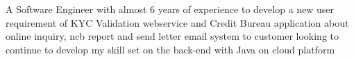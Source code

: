 


\begin{cvparagraph}


\quad A Software Engineer with almost 6 years of experience to develop a new user requirement of KYC Validation webservice and Credit Bureau application about online inquiry, ncb report and send letter email system to customer looking to continue to develop my skill set on the back-end with Java on cloud platform

\end{cvparagraph}
